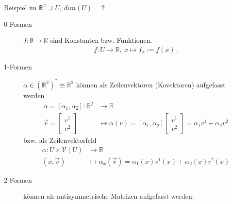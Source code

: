 \documentclass{beamer}
\newcommand{\R}{\mathds{R}}
\newcommand{\formpunkt}{\,\text{.}}
\begin{document}
  \begin{frame}
    \begin{block}{Beispiel im \( \R^{2} \supseteq U\), \( dim(U) = 2 \)}
      \begin{description}
        \item[0-Formen] \( f:\emptyset\rightarrow\R \) sind Konstanten
          bzw. Funktionen.
          \begin{align*}
            f:U\rightarrow\R,\ x\mapsto f_{x}:=f(x) \formpunkt
          \end{align*}
        \item[1-Formen] \( \alpha\in\left( \R^{2} \right)^{*}\cong\R^{2}  \) können als Zeilenvektoren (Kovektoren)
          aufgefasst werden
          \begin{align*}
            \alpha = \left[ \alpha_{1},\alpha_{2} \right]:\R^{2}&\rightarrow\R \\ 
                   \vec{v} = \begin{bmatrix}
                    v^{1} \\ v^{2}
                   \end{bmatrix}
                   &\mapsto \alpha(v) = \left[ \alpha_{1},\alpha_{2} \right] \begin{bmatrix}
                          v^{1} \\ v^{2}
                          \end{bmatrix}
                   = \alpha_{1}v^{1} + \alpha_{2}v^{2}
          \end{align*}
          bzw. als Zeilenvektorfeld
          \begin{align*}
            \alpha: U\times\mathcal{V}(U)&\rightarrow\R\\
                  \left( x,\vec{v} \right)&\mapsto\alpha_{x}(\vec{v})=\alpha_{1}(x)v^{1}(x) + \alpha_{2}(x)v^{2}(x)
          \end{align*}
        \item[2-Formen] können als antisymmetrische Matrizen aufgefasst werden.
      \end{description}
    \end{block}
  \end{frame}
\end{document}
